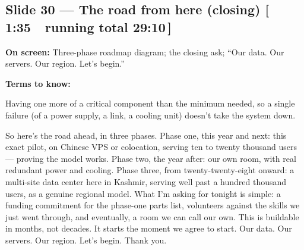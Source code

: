 \documentclass[11pt]{article}
\newcommand{\onscreen}[1]{\noindent\textbf{\color{sovGrey}On screen:} #1\par\vspace{4pt}}
\newcommand{\timing}[2]{\hfill{\normalsize\color{sovGrey}[\,#1\ \textbar\ running total #2\,]}}
\newenvironment{terms}
  {\noindent\textbf{\color{sovGrey}Terms to know:}
   \begin{description}[leftmargin=0pt,style=sameline,labelindent=0pt,itemsep=2pt,topsep=2pt,font=\normalfont\bfseries\color{sovDark}]}
  {\end{description}\vspace{2pt}}
\begin{document}
\subsection*{Slide 30 --- The road from here (closing) \timing{1:35}{29:10}}
\onscreen{Three-phase roadmap diagram; the closing ask; ``Our data. Our servers. Our
region. Let's begin.''}
\begin{terms}
  \item[N+1 redundancy] Having one more of a critical component than the minimum
    needed, so a single failure (of a power supply, a link, a cooling unit) doesn't
    take the system down.
\end{terms}
\begin{sayit}
So here's the road ahead, in three phases. Phase one, this year and next: this exact
pilot, on Chinese VPS or colocation, serving ten to twenty thousand users --- proving the
model works. Phase two, the year after: our own room, with real redundant power and
cooling. Phase three, from twenty-twenty-eight onward: a multi-site data center here in
Kashmir, serving well past a hundred thousand users, as a genuine regional model. What
I'm asking for tonight is simple: a funding commitment for the phase-one parts list,
volunteers against the skills we just went through, and eventually, a room we can call
our own. This is buildable in months, not decades. It starts the moment we agree to
start. Our data. Our servers. Our region. Let's begin. Thank you.
\end{sayit}

\clearpage
\end{document}
